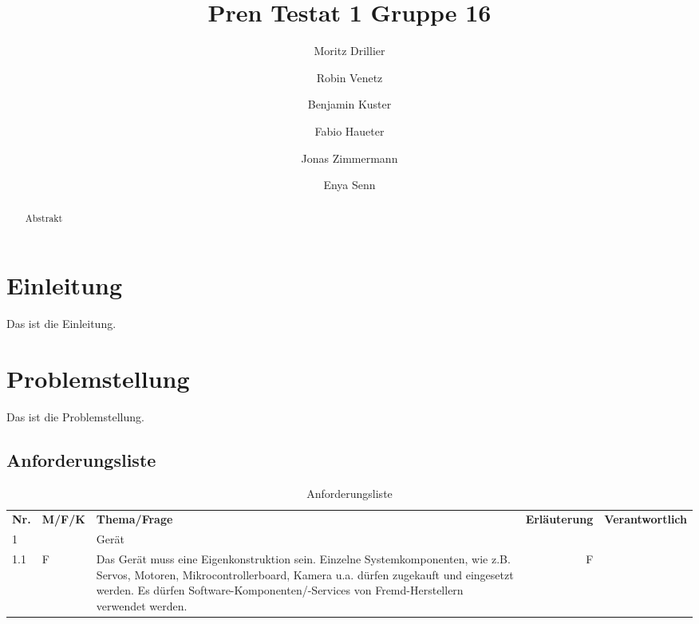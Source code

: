 \documentclass{article}
\title{Pren Testat 1 Gruppe 16}
\author{Moritz Drillier \and Robin Venetz \and Benjamin Kuster \and Fabio Haueter \and Jonas Zimmermann \and Enya Senn}
\date{\thedate}
\begin{document}
\maketitle

\tableofcontents 

\begin{abstract}
Abstrakt
\end{abstract}

\section{Einleitung}
Das ist die Einleitung.
\section{Problemstellung}
Das ist die Problemstellung.



\begin{landscape} %
    \section{Anforderungsliste}
    \begin{table}[H] %
        \centering
        \begin{tabular}{llp{17cm}rr}
            \textbf{Nr.} & \textbf{M/F/K} & \textbf{Thema/Frage} & \textbf{Erläuterung} & \textbf{Verantwortlich} \\
            1 &  & Gerät & &   \\
            1.1 & F & Das Gerät muss eine Eigenkonstruktion sein. Einzelne Systemkomponenten, wie z.B. Servos,
            Motoren, Mikrocontrollerboard, Kamera u.a. dürfen zugekauft und eingesetzt werden. Es
            dürfen Software-Komponenten/-Services von Fremd-Herstellern verwendet werden. & F &   \\
        \end{tabular}
        \caption{Anforderungsliste}
        \label{tab:my_label}
    \end{table}
\end{landscape} %
\end{document}
